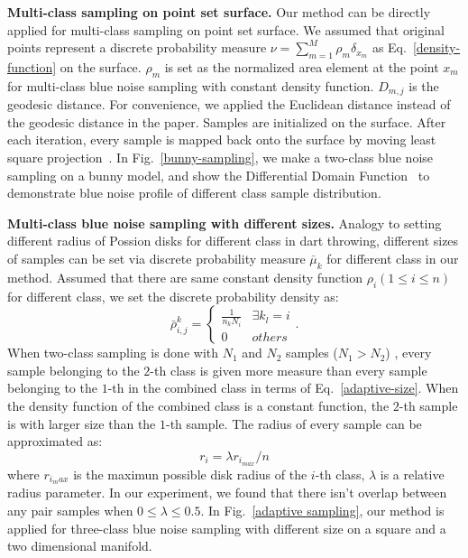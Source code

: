 \textbf{Multi-class sampling on point set surface.}
Our method can be directly applied for multi-class sampling on point set surface.
We assumed that original points represent a discrete probability measure $\nu=\sum\limits_{m=1}^{M}\rho_m\delta_{x_m}$ as Eq.~\ref{density-function} on the surface.
$\rho_m$ is set as the normalized area element at the point $x_m$ for multi-class blue noise sampling with constant density function.
$D_{m,j}$ is the geodesic distance.
For convenience,
we applied the Euclidean distance instead of the geodesic distance in the paper.
Samples are initialized on the surface.
After each iteration,
every sample is mapped back onto the surface by
moving least square projection~\cite{alexa:2001:point}.
In Fig.~\ref{bunny-sampling},
we make a two-class blue noise sampling on a bunny model,
and show the Differential Domain Function~\cite{wei:2011:differential} to demonstrate blue noise profile of different class sample distribution.

\textbf{Multi-class blue noise sampling with different sizes.}
Analogy to setting different radius of Possion disks for different class in dart throwing,
different sizes of samples can be set  via discrete probability measure $\bar\mu_k$ for different class in our method.
Assumed that there are same constant density function $\rho_i (1\leq i\leq n)$ for different class,
we set the discrete probability density as:
\begin{equation}\label{adaptive-size}
  \bar\rho_{i,j}^k= \left\{
  \begin{array} {cl}
  \frac{1}{n_kN_i} & \exists k_l = i \\
  0 & others
  \end{array} \right..
\end{equation}
When two-class sampling is done with $N_1$ and $N_2$ samples ($N_1>N_2$) ,
every sample belonging to the $2$-th class is given more measure than every sample belonging to the $1$-th in the combined class in terms of Eq.~\ref{adaptive-size}.
When the density function of the combined class is a constant function,
the $2$-th sample is with larger size than the $1$-th sample.
The radius of every sample can be approximated as:
\begin{equation*}
  r_i=\lambda r_{i_{max}}/n
\end{equation*}
where $r_{i_max}$ is the maximun possible disk radius of the $i$-th class,
$\lambda$ is a relative radius parameter.
In our experiment,
we found that there isn't overlap between any pair samples when $0\leq\lambda\leq 0.5$.
In Fig.~\ref{adaptive sampling},
our method is applied for three-class blue noise sampling with different size on a square and a two dimensional manifold.


